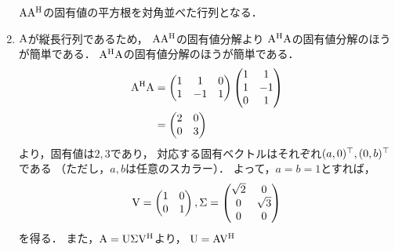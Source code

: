 \begin{enumerate}[label=(\roman*)]
        $\mathrm{A}\mathrm{A}^\mathrm{H}$の固有値の平方根を対角並べた行列となる．
      \item $\mathrm{A}$が縦長行列であるため，
        $\mathrm{A}\mathrm{A}^\mathrm{H}$の固有値分解より
        $\mathrm{A}^\mathrm{H}\mathrm{A}$の固有値分解のほうが簡単である．
        $\mathrm{A}^\mathrm{H}\mathrm{A}$の固有値分解のほうが簡単である．
        \begin{align}
          \mathrm{A}^\mathrm{H}\mathrm{A}
            &= 
              \begin{pmatrix}
                1 & 1 & 0 \\
                1 & -1 & 1
              \end{pmatrix}
              \begin{pmatrix}
                1 & 1 \\
                1 & -1 \\
                0 & 1
              \end{pmatrix} \\
            &=
              \begin{pmatrix}
                2 & 0 \\
                0 & 3 
              \end{pmatrix}
        \end{align}
        より，固有値は$2, 3$であり，
        対応する固有ベクトルはそれぞれ$(a, 0)^\top, (0, b)^\top$である
        （ただし，$a, b$は任意のスカラー）．
        よって，$a = b = 1$とすれば，
        \begin{equation}
          \mathrm{V} = 
          \begin{pmatrix}
            1 & 0 \\
            0 & 1 
          \end{pmatrix},
          \mathrm{\Sigma} =
          \begin{pmatrix}
            \sqrt{2} & 0 \\
            0 & \sqrt{3} \\
            0 & 0
          \end{pmatrix}
        \end{equation}
        を得る．
        また，$\mathrm{A} = \mathrm{U}\mathrm{\Sigma}\mathrm{V}^\mathrm{H}$より，
        $\mathrm{U} = \mathrm{A}\mathrm{V}^\mathrm{H}$
        

    \end{enumerate}

